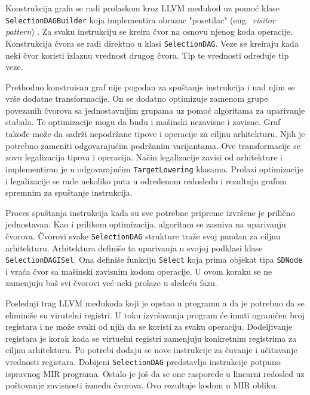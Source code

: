\documentclass[12pt,oneside]{memoir}
\begin{document}
Konstrukcija grafa se radi prolaskom kroz LLVM međukod uz pomoć klase \verb|SelectionDAGBuilder| koja implementira obrazac "posetilac" (eng.~{\em visitor pattern}) \cite{gamma1995design}. 
Za svaku instrukciju se kreira čvor na osnovu njenog koda operacije.
Konstrukcija čvora se radi direktno u klasi \verb|SelectionDAG|.
Veze se kreiraju kada neki čvor koristi izlaznu vrednost drugog čvora.
Tip te vrednosti određuje tip veze.

Prethodno konstruisan graf nije pogodan za spuštanje instrukcija i nad njim se vrše dodatne transformacije.
On se dodatno optimizuje zamenom grupe povezanih čvorova sa jednostavnijim grupama uz pomoć algoritama za uparivanje stabala.
Te optimizacije mogu da budu i mašinski nezavisne i zavisne.
Graf takođe može da sadrži nepodržane tipove i operacije za ciljnu arhitekturu.
Njih je potrebno zameniti odgovarajućim podržanim varijantama.
Ove transformacije se zovu legalizacija tipova i operacija.
Način legalizacije zavisi od arhitekture i implementiran je u odgovarajućim \verb|TargetLowering| klasama.
Prolazi optimizacije i legalizacije se rade nekoliko puta u određenom redosledu i rezultuju grafom spremnim za spuštanje instrukcija.

Proces spuštanja instrukcija kada su sve potrebne pripreme izvršene je prilično jednostavan.
Kao i prilikom optimizacija, algoritam se zasniva na uparivanju čvorova.
Čvorovi svake \verb|SelectionDAG| strukture traže svoj pandan za ciljnu arhitekturu.
Arhitektura definiše ta uparivanja u svojoj podklasi klase \verb|SelectionDAGISel|.
Ona definiše funkciju \verb|Select| koja prima objekat tipa \verb|SDNode| i vraća čvor sa mašinski zavisnim kodom operacije.
U ovom koraku se ne zamenjuju baš svi čvorovi već neki prolaze u sledeću fazu.

Poslednji trag LLVM međukoda koji je opstao u programu a da je potrebno da se eliminiše su virutelni registri.
U toku izvršavanja program će imati ograničen broj registara i ne može svaki od njih da se koristi za svaku operaciju.
Dodeljivanje registara je korak kada se virtuelni registri zamenjuju konkretnim registrima za ciljnu arhitekturu.
Po potrebi dodaju se nove instrukcije za čuvanje i učitavanje vrednosti registara.
Dobijeni \verb|SelectionDAG| predstavlja instrukcije potpuno ispravnog MIR programa.
Ostalo je još da se one rasporede u linearni redosled uz poštovanje zavisnosti između čvorova.
Ovo rezultuje kodom u MIR obliku.
\end{document}
